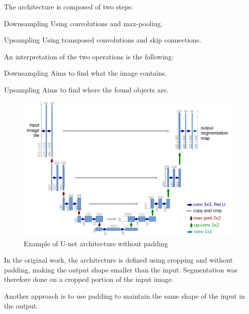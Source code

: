 The architecture is composed of two steps:
\begin{descriptionlist}
    \item[Downsampling] Using convolutions and max-pooling.
    \item[Upsampling] Using transposed convolutions and skip connections.
\end{descriptionlist}

\begin{remark}
    An interpretation of the two operations is the following:
    \begin{descriptionlist}
        \item[Downsampling] Aims to find what the image contains.
        \item[Upsampling] Aims to find where the found objects are.
    \end{descriptionlist}
\end{remark}

\begin{figure}[H]
    \centering
    \includegraphics[width=0.75\linewidth]{./img/_unet.pdf}
    \caption{Example of U-net architecture without padding}
\end{figure}

\begin{remark}
    In the original work, the architecture is defined using cropping and without padding, making the output shape smaller than the input.
    Segmentation was therefore done on a cropped portion of the input image.

    Another approach is to use padding to maintain the same shape of the input in the output.
\end{remark}